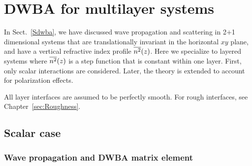 

\chapter{DWBA for multilayer systems}  \label{sec:Multilayers}


%

In Sect.~\ref{Sdwba},
we have discussed wave propagation and scattering in 2$+$1 dimensional systems
that are translationally invariant in the horizontal $xy$ plane,
and have a vertical refractive index profile $\overline{n^2}(z)$.
Here we specialize to layered systems
where $\overline{n^2}(z)$ is a step function that is constant within one layer.
First, only scalar interactions are considered.
Later, the theory is extended to account for polarization effects.


All layer interfaces are assumed to be perfectly smooth.
For rough interfaces, see Chapter~\ref{sec:Roughness}.

\section{Scalar case}

\subsection{Wave propagation and DWBA matrix element}

%

